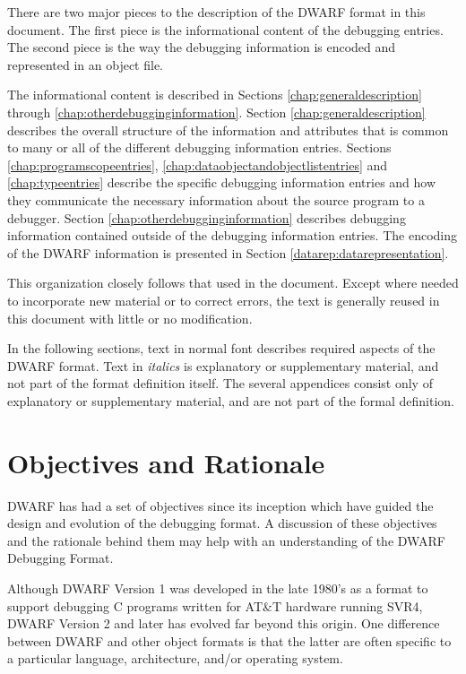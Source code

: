 There are two major pieces to the description of the DWARF
format in this document. The first piece is the informational
content of the debugging entries. The second piece is the
way the debugging information is encoded and represented in
an object file.

The informational content is described in 
Sections \ref{chap:generaldescription} 
through
\ref{chap:otherdebugginginformation}. 
Section  \ref{chap:generaldescription}
describes the overall structure of the information
and attributes that is common to many or all of the different
debugging information entries. 
Sections \ref{chap:programscopeentries}, 
\ref{chap:dataobjectandobjectlistentries} and 
\ref{chap:typeentries} describe
the specific debugging information entries and how they
communicate the necessary information about the source program
to a debugger. 
Section \ref{chap:otherdebugginginformation} 
describes debugging information
contained outside of the debugging information entries. The
encoding of the DWARF information is presented in 
Section \ref{datarep:datarepresentation}.

This organization closely follows that used in the 
\DWARFVersionIV{} document. Except where needed to incorporate
new material or to correct errors, the \DWARFVersionIV{}
text is generally reused in this document with little or
no modification.

In the following sections, text in normal font describes
required aspects of the DWARF format.  Text in \textit{italics} is
explanatory or supplementary material, and not part of the
format definition itself. The several appendices consist only
of explanatory or supplementary material, and are not part
of the formal definition.

\bb
\section{Objectives and Rationale}

DWARF has had a set of objectives since its inception which have guided the design and evolution of the debugging format.  A discussion of these objectives and the rationale behind them may help with an understanding of the DWARF Debugging Format. 

Although DWARF Version 1 was developed in the late 1980's as a format to support debugging C programs written for AT\&T hardware running SVR4, DWARF Version 2 and later has evolved far beyond this origin. One difference between DWARF and other object formats is that the latter are often specific to a particular language, architecture, and/or operating system. 

